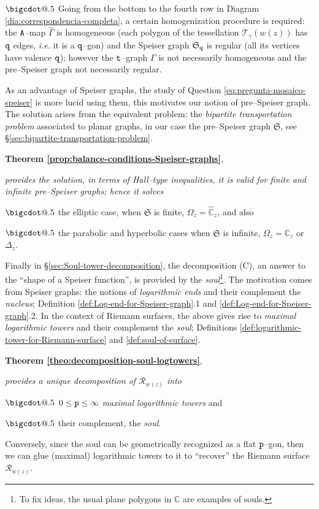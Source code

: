 \documentclass[final,3p,times]{elsarticle}
\makeatletter
\newcommand{\CC}{\ensuremath{{\mathbb C}}}
\newcommand{\CW}{\ensuremath{{\widehat{\mathbb C}}}}
\newcommand{\R}{\ensuremath{{\mathcal R}}}
\newcommand*\bigcdot{\mathpalette\bigcdot@{.5}}
\newcommand*\bigcdot@[2]{\mathbin{\vcenter{\hbox{\scalebox{#2}{$\m@th#1\bullet$}}}}}
\theoremstyle{definition}
\makeatother
\begin{document}
\noindent
$\bigcdot$ 
Going from the bottom to the fourth row
in Diagram \ref{dia:correspondencia-completa}, 
a certain homogenization procedure is 
required: the $\tt A$--map $\widehat{\Gamma}$ is homogeneous
(each polygon 
of the tessellation $\mathscr{T}_\gamma(w(z))$
has  ${\tt q}$ edges, 
\emph{i.e.} it is a $\tt q$--gon) and
the Speiser graph $\mathfrak{S}_{\tt q}$ is regular
(all its vertices have valence $\tt q$); however
the $\tt t$--graph $\Gamma$ is not necessarily
homogeneous and the pre--Speiser graph 
not necessarily regular. 


\smallskip 


\noindent
As an advantage of Speiser graphs, the study of
Question \eqref{eq:pregunta-mosaico-speiser}
is more lucid using them, this motivates
our notion of  pre--Speiser graph. 
The solution arises from the equivalent problem:
the \emph{bipartite transportation problem} associated to
planar graphs, in our case
the pre--Speiser graph $\mathfrak{S}$, 
see \S\ref{sec:bipartite-transportation-problem}.

\smallskip

\noindent
\textbf{Theorem \ref{prop:balance-conditions-Speiser-graphs}},
{\it
provides the solution, in terms of Hall--type inequalities,
it is valid for finite and infinite pre--Speiser graphs; 
hence it solves 

\noindent 
$\bigcdot$ 
the
elliptic case, when $\mathfrak{S}$ is finite, $\Omega_z=\CW_z$, and 
also

\noindent 
$\bigcdot$ 
the parabolic and hyperbolic cases 
when $\mathfrak{S}$ is infinite, $\Omega_z=\CC_z$ or $\Delta_z$.
}


\medskip

Finally in \S\ref{sec:Soul-tower-decomposition},
the decomposition (C),
an answer to the ``shape of a Speiser function'', is provided by the \emph{soul}\footnote{
To fix ideas, the usual plane polygons in $\CC$
are examples of souls.}.
The motivation comes from Speiser graphs: the notions of \emph{logarithmic ends} 
and their complement the \emph{nucleus}; 
Definition \ref{def:Log-end-for-Speiser-graph}.1 
and \ref{def:Log-end-for-Speiser-graph}.2.
In the context of Riemann surfaces, the above
gives rise to \emph{maximal logarithmic towers} and 
their complement the \emph{soul};
Definitions \ref{def:logarithmic-tower-for-Riemann-surface} and 
\ref{def:soul-of-surface}.

\smallskip 


\noindent
\textbf{Theorem \ref{theo:decomposition-soul-logtowers}},
{\it
provides
a unique decomposition of $\R_{w(z)}$ into

\noindent 
$\bigcdot$ 
$0 \leq {\tt p} \leq \infty$ 
\emph{maximal logarithmic towers}
and 
 
\noindent 
$\bigcdot$
their complement, the \emph{soul}.  

\noindent 
Conversely, since the soul can be geometrically recognized as a flat $\tt p$--gon, then we can glue (maximal) logarithmic towers to it to ``recover'' the Riemann surface $\R_{w(z)}$.
}
\end{document}
